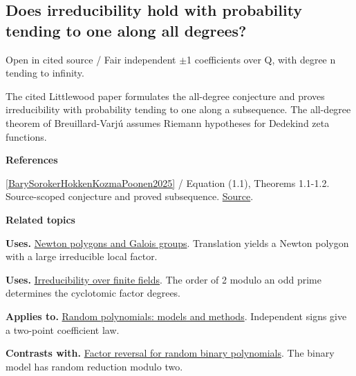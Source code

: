 \documentclass[11pt,a4paper,oneside,openany]{book}
\newenvironment{sources}{\par\smallskip\begingroup\footnotesize\color{atlasgray}\leftskip=10pt\setlength{\parskip}{2pt}}{\par\endgroup\smallskip}
\begin{document}
\subsection*{Does irreducibility hold with probability tending to one along all degrees?}
{\small\sffamily\color{atlasgold}Open in cited source / Fair independent \ensuremath{\pm}1 coefficients over Q, with degree n tending to infinity.}\par\smallskip
\color{black} The cited Littlewood paper formulates the all-degree conjecture and proves irreducibility with probability tending to one along a subsequence. The all-degree theorem of Breuillard-Varjú assumes Riemann hypotheses for Dedekind zeta functions.\par
\begin{sources}
\textbf{References}\par\smallskip
\noindent\hyperlink{ref:BarySorokerHokkenKozmaPoonen2025}{[BarySorokerHokkenKozmaPoonen2025]} / Equation (1.1), Theorems 1.1-1.2. Source-scoped conjecture and proved subsequence. \href{https://arxiv.org/abs/2308.04878}{Source}.\par
\end{sources}\color{black}
\par\medskip\begingroup\footnotesize\setlength{\parskip}{1pt}\textbf{\sffamily\color{atlasgreen}Related topics}\par
\color{black}\textbf{Uses.} \hyperlink{article:newton-polygons}{Newton polygons and Galois groups}. Translation yields a Newton polygon with a large irreducible local factor.\par
\color{black}\textbf{Uses.} \hyperlink{article:finite-field-irreducibility}{Irreducibility over finite fields}. The order of 2 modulo an odd prime determines the cyclotomic factor degrees.\par
\color{black}\textbf{Applies to.} \hyperlink{article:random-models}{Random polynomials: models and methods}. Independent signs give a two-point coefficient law.\par
\color{black}\textbf{Contrasts with.} \hyperlink{article:factor-reversal}{Factor reversal for random binary polynomials}. The binary model has random reduction modulo two.\par
\endgroup
\end{document}
